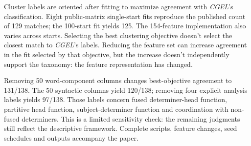 \documentclass[12pt]{article}
\begin{document}
Cluster labels are oriented after fitting to maximize agreement with \textit{CGEL}'s classification. Eight public-matrix single-start fits reproduce the published count of 129 matches; the 100-start fit yields 125. The 154-feature implementation also varies across starts. Selecting the best clustering objective doesn't select the closest match to \textit{CGEL}'s labels. Reducing the feature set can increase agreement in the fit selected by that objective, but the increase doesn't independently support the taxonomy: the feature representation has changed.

Removing 50 word-component columns changes best-objective agreement to 131/138. The 50 syntactic columns yield 120/138; removing four explicit analysis labels yields 97/138. Those labels concern fused determiner-head function, partitive head function, subject-determiner function and coordination with non-fused determiners. This is a limited sensitivity check: the remaining judgments still reflect the descriptive framework. Complete scripts, feature changes, seed schedules and outputs accompany the paper.

\clearpage
\printbibliography
\end{document}
